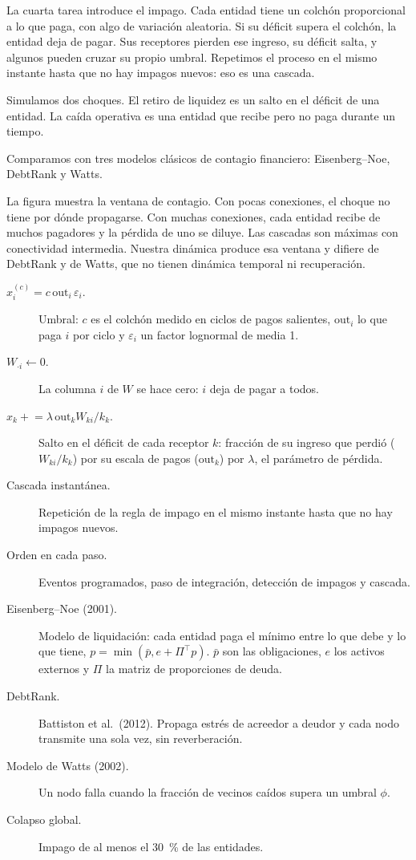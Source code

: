 \begin{decir}
La cuarta tarea introduce el impago. Cada entidad tiene un colchón proporcional a lo que
paga, con algo de variación aleatoria. Si su déficit supera el colchón, la entidad deja
de pagar. Sus receptores pierden ese ingreso, su déficit salta, y algunos pueden cruzar
su propio umbral. Repetimos el proceso en el mismo instante hasta que no hay impagos
nuevos: eso es una cascada.

Simulamos dos choques. El retiro de liquidez es un salto en el déficit de una entidad.
La caída operativa es una entidad que recibe pero no paga durante un tiempo.

Comparamos con tres modelos clásicos de contagio financiero: Eisenberg–Noe, DebtRank y
Watts.

La figura muestra la ventana de contagio. Con pocas conexiones, el choque no tiene por
dónde propagarse. Con muchas conexiones, cada entidad recibe de muchos pagadores y la
pérdida de uno se diluye. Las cascadas son máximas con conectividad intermedia. Nuestra
dinámica produce esa ventana y difiere de DebtRank y de Watts, que no tienen dinámica
temporal ni recuperación.
\end{decir}
\begin{terminos}
\begin{description}
\item[$x_i^{(c)}=c\,\mathrm{out}_i\,\varepsilon_i$.] Umbral: $c$ es el colchón medido en
ciclos de pagos salientes, $\mathrm{out}_i$ lo que paga $i$ por ciclo y $\varepsilon_i$
un factor lognormal de media 1.
\item[$W_{\cdot i}\leftarrow0$.] La columna $i$ de $W$ se hace cero: $i$ deja de pagar
a todos.
\item[$x_k\mathrel{+}=\lambda\,\mathrm{out}_k W_{ki}/k_k$.] Salto en el déficit de cada
receptor $k$: fracción de su ingreso que perdió ($W_{ki}/k_k$) por su escala de pagos
($\mathrm{out}_k$) por $\lambda$, el parámetro de pérdida.
\item[Cascada instantánea.] Repetición de la regla de impago en el mismo instante hasta
que no hay impagos nuevos.
\item[Orden en cada paso.] Eventos programados, paso de integración, detección de
impagos y cascada.
\item[Eisenberg–Noe (2001).] Modelo de liquidación: cada entidad paga el mínimo entre lo
que debe y lo que tiene, $p=\min(\bar p,e+\Pi^\top p)$. $\bar p$ son las obligaciones,
$e$ los activos externos y $\Pi$ la matriz de proporciones de deuda.
\item[DebtRank.] Battiston et al.\ (2012). Propaga estrés de acreedor a deudor y cada
nodo transmite una sola vez, sin reverberación.
\item[Modelo de Watts (2002).] Un nodo falla cuando la fracción de vecinos caídos supera
un umbral $\phi$.
\item[Colapso global.] Impago de al menos el 30~\% de las entidades.
\end{description}
\end{terminos}

